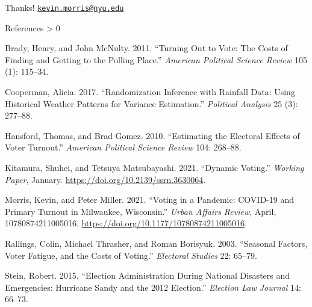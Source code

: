 \documentclass[
  ignorenonframetext,
  aspectratio=169]{beamer}
\newlength{\cslhangindent}
\newenvironment{CSLReferences}[2] %
 {%
  \setlength{\parindent}{0pt}
  \ifodd #1 \everypar{\setlength{\hangindent}{\cslhangindent}}\ignorespaces\fi
  \ifnum #2 > 0
  \setlength{\parskip}{#2\baselineskip}
  \fi
 }%
 {}
\begin{document}
\begin{frame}{Thanks!}
\protect\hypertarget{thanks}{}
\href{mailto:kevin.morris@nyu.edu}{\nolinkurl{kevin.morris@nyu.edu}}
\end{frame}

\begin{frame}[allowframebreaks]{References}
\protect\hypertarget{references}{}
\hypertarget{refs}{}
\begin{CSLReferences}{1}{0}
\leavevmode\hypertarget{ref-Brady2011}{}%
Brady, Henry, and John McNulty. 2011. {``Turning Out to Vote: {The
Costs} of {Finding} and {Getting} to the {Polling Place}.''}
\emph{American Political Science Review} 105 (1): 115--34.

\leavevmode\hypertarget{ref-Cooperman2017}{}%
Cooperman, Alicia. 2017. {``Randomization {Inference} with {Rainfall
Data}: {Using Historical Weather Patterns} for {Variance Estimation}.''}
\emph{Political Analysis} 25 (3): 277--88.

\leavevmode\hypertarget{ref-Hansford2010}{}%
Hansford, Thomas, and Brad Gomez. 2010. {``Estimating the {Electoral
Effects} of {Voter Turnout}.''} \emph{American Political Science Review}
104: 268--88.

\leavevmode\hypertarget{ref-Kitamura2021}{}%
Kitamura, Shuhei, and Tetsuya Matsubayashi. 2021. {``Dynamic
{Voting}.''} \emph{Working Paper}, January.
\url{https://doi.org/10.2139/ssrn.3630064}.

\leavevmode\hypertarget{ref-Morris2021}{}%
Morris, Kevin, and Peter Miller. 2021. {``Voting in a {Pandemic}:
{COVID}-19 and {Primary Turnout} in {Milwaukee}, {Wisconsin}.''}
\emph{Urban Affairs Review}, April, 10780874211005016.
\url{https://doi.org/10.1177/10780874211005016}.

\leavevmode\hypertarget{ref-Rallings2003}{}%
Rallings, Colin, Michael Thrasher, and Roman Borisyuk. 2003. {``Seasonal
{Factors}, Voter Fatigue, and the Costs of Voting.''} \emph{Electoral
Studies} 22: 65--79.

\leavevmode\hypertarget{ref-Stein2015}{}%
Stein, Robert. 2015. {``Election {Administration During National
Disasters} and {Emergencies}: {Hurricane Sandy} and the 2012
{Election}.''} \emph{Election Law Journal} 14: 66--73.

\end{CSLReferences}
\end{frame}
\end{document}
